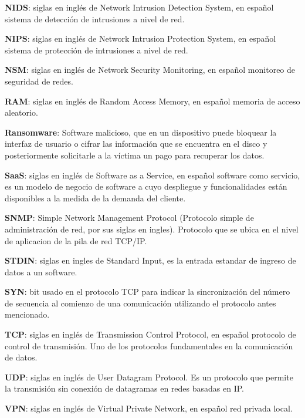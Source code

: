 \textbf{NIDS}: siglas en inglés de Network Intrusion Detection System, en español sistema de detección de intrusiones a nivel de red. \par

\textbf{NIPS}: siglas en inglés de Network Intrusion Protection System, en español sistema de protección de intrusiones a nivel de red. \par

\textbf{NSM}: siglas en inglés de Network Security Monitoring, en español monitoreo de seguridad de redes. \par

\textbf{RAM}: siglas en inglés de Random Access Memory, en español memoria de acceso aleatorio. \par

\textbf{Ransomware}: Software malicioso, que en un dispositivo puede bloquear la interfaz de usuario o cifrar las información que se encuentra en el disco y posteriormente solicitarle a la víctima un pago para recuperar los datos. \par
\textbf{SaaS}: siglas en inglés de Software as a Service, en español software como servicio, es un modelo de negocio de software a cuyo despliegue y funcionalidades están disponibles a la medida de la demanda del cliente. \par

\textbf{SNMP}: Simple Network Management Protocol (Protocolo simple de administración de red, por sus siglas en ingles). Protocolo que se ubica en el nivel de aplicacion de la pila de red TCP/IP.  \par

\textbf{STDIN}: siglas en ingles de Standard Input, es la entrada estandar de ingreso de datos a un software.\par

\textbf{SYN}: bit usado en el protocolo TCP para indicar la sincronización del número de secuencia al comienzo de una comunicación utilizando el protocolo antes mencionado. \par

\textbf{TCP}: siglas en inglés de Transmission Control Protocol, en español protocolo de control de transmisión. Uno de los protocolos fundamentales en la comunicación de datos. \par

\textbf{UDP}: siglas en inglés de User Datagram Protocol. Es un protocolo que permite la transmisión sin conexión de datagramas en redes basadas en IP. \par

\textbf{VPN}: siglas en inglés de Virtual Private Network, en español red privada local. \par
